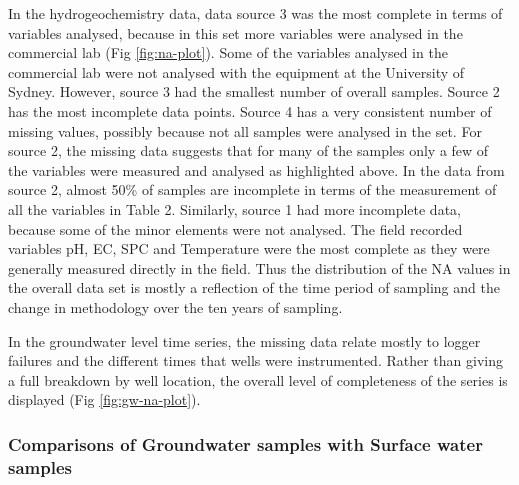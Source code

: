 \documentclass[, manuscript]{copernicus}
\begin{document}
In the hydrogeochemistry data, data source 3 was the most complete in
terms of variables analysed, because in this set more variables were
analysed in the commercial lab (Fig \ref{fig:na-plot}). Some of the
variables analysed in the commercial lab were not analysed with the
equipment at the University of Sydney. However, source 3 had the
smallest number of overall samples. Source 2 has the most incomplete
data points. Source 4 has a very consistent number of missing values,
possibly because not all samples were analysed in the set. For source 2,
the missing data suggests that for many of the samples only a few of the
variables were measured and analysed as highlighted above. In the data
from source 2, almost 50\% of samples are incomplete in terms of the
measurement of all the variables in Table 2. Similarly, source 1 had
more incomplete data, because some of the minor elements were not
analysed. The field recorded variables pH, EC, SPC and Temperature were
the most complete as they were generally measured directly in the field.
Thus the distribution of the NA values in the overall data set is mostly
a reflection of the time period of sampling and the change in
methodology over the ten years of sampling.

In the groundwater level time series, the missing data relate mostly to
logger failures and the different times that wells were instrumented.
Rather than giving a full breakdown by well location, the overall level
of completeness of the series is displayed (Fig \ref{fig:gw-na-plot}).

\subsubsection{Comparisons of Groundwater samples with Surface water
samples}
\end{document}
